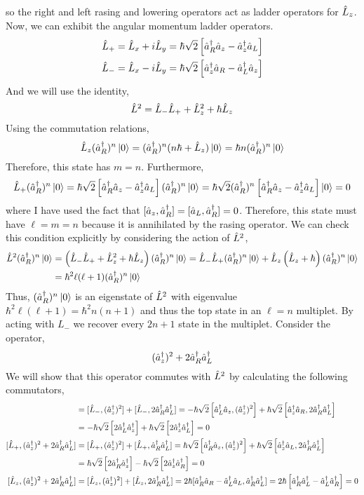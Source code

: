 \documentclass[12pt]{extarticle}
\begin{document}
so the right and left rasing and lowering operators act as ladder operators for $\hat{L}_z$. Now, we can exhibit the angular momentum ladder operators. 
\begin{align*}
\hat{L}_{+} & = \hat{L}_x + i \hat{L}_y = \hbar \sqrt{2} \left[ \hat{a}^\dagger_R \hat{a}_z -\hat{a}^\dagger_z \hat{a}_L \right] \\
\hat{L}_{-} & = \hat{L}_x - i \hat{L}_y = \hbar \sqrt{2} \left[ \hat{a}^\dagger_z \hat{a}_R - \hat{a}^\dagger_L \hat{a}_z \right] \\
\end{align*}
And we will use the identity,
\[\hat{L}^2 = \hat{L}_{-} \hat{L}_{+} + \hat{L}_z^2 + \hbar \hat{L}_z\]
Using the commutation relations, 
\[ \hat{L}_z (\hat{a}^\dagger_R)^n \left| 0 \right> = (\hat{a}^\dagger_R)^n (n \hbar + \hat{L}_z)\left| 0 \right> = \hbar n (\hat{a}^\dagger_R)^n \left| 0 \right>\]
Therefore, this state has $m = n$. Furthermore, 
\begin{align*} \hat{L}_{+} (\hat{a}^\dagger_R)^n \left| 0 \right> = \hbar \sqrt{2} \left[ \hat{a}^\dagger_R \hat{a}_z - \hat{a}^\dagger_z \hat{a}_L \right] (\hat{a}^\dagger_R)^n \left| 0 \right> = \hbar \sqrt{2} (\hat{a}^\dagger_R)^n \left[ \hat{a}^\dagger_R \hat{a}_z - \hat{a}^\dagger_z \hat{a}_L \right]  \left| 0 \right> = 0
\end{align*}
where I have used the fact that $[ \hat{a}_z, \hat{a}^\dagger_R] = [\hat{a}_L, \hat{a}^\dagger_R] = 0$. Therefore, this state must have $\ell = m = n$ because it is annihilated by the rasing operator. We can check this condition explicitly by considering the action of $\hat{L}^2$,
\begin{align*}
\hat{L}^2 (\hat{a}^\dagger_R)^n \left| 0 \right> & = \left(\hat{L}_{-} \hat{L}_{+} + \hat{L}_{z}^2 + \hbar \hat{L}_z\right) (\hat{a}^\dagger_R)^n \left| 0 \right> = \hat{L}_{-} \hat{L}_{+} (\hat{a}^\dagger_R)^n \left| 0 \right> + \hat{L}_{z} \left( \hat{L}_z + \hbar \right)  (\hat{a}^\dagger_R)^n \left| 0 \right> \\ & = \hbar^2 \ell(\ell + 1) (\hat{a}^\dagger_R)^n \left| 0 \right>
\end{align*} 
Thus, $(\hat{a}^\dagger_R)^n \left| 0 \right>$ is an eigenstate of $\hat{L}^2$ with eigenvalue $\hbar^2 \ell (\ell + 1) = \hbar^2 n(n + 1)$ and thus the top state in an $\ell = n$ multiplet. By acting with $L_{-}$ we recover every $2 n + 1$ state in the multiplet. Consider the operator,
\[ (\hat{a}^\dagger_z)^2 + 2 \hat{a}^\dagger_R \hat{a}^\dagger_L\]
We will show that this operator commutes with $\hat{L}^2$ by calculating the following commutators,
\begin{align*}
[\L_{-}, (\adag_z)^2 + 2 \adag_R \adag_L] & = [\L_{-}, (\adag_z)^2] + [\L_{-},  2\adag_R \adag_L] = - \hbar \sqrt{2} \left[\adag_L \a_z, (\adag_z)^2 \right] + \hbar \sqrt{2} \left[ \adag_z \a_R, 2 \adag_R \adag_L \right] \\ 
& =  - \hbar \sqrt{2} \left[ 2 \adag_L \adag_z \right] + \hbar \sqrt{2} \left[2 \adag_z \adag_L \right] = 0 \\
[\L_{+}, (\adag_z)^2 + 2 \adag_R \adag_L] & = [\L_{+}, (\adag_z)^2] + [\L_{+},  \adag_R \adag_L] = \hbar \sqrt{2} \left[\adag_R \a_z, (\adag_z)^2 \right] + \hbar \sqrt{2} \left[ \adag_z \a_L, 2 \adag_R \adag_L \right] \\
& = \hbar \sqrt{2} \left[ 2 \adag_R \adag_z \right] - \hbar \sqrt{2} \left[2 \adag_z \adag_R \right] = 0 \\
[\L_{z}, (\adag_z)^2 + 2 \adag_R \adag_L] & = [\L_{z}, (\adag_z)^2] + [\L_{z}, 2 \adag_R \adag_L] = 2 \hbar [ \adag_R \a_R - \adag_L \a_L, \adag_R \adag_L] = 2 \hbar \left[ \adag_R \adag_L - \adag_L \adag_R \right] = 0
\end{align*}  
\end{document}
